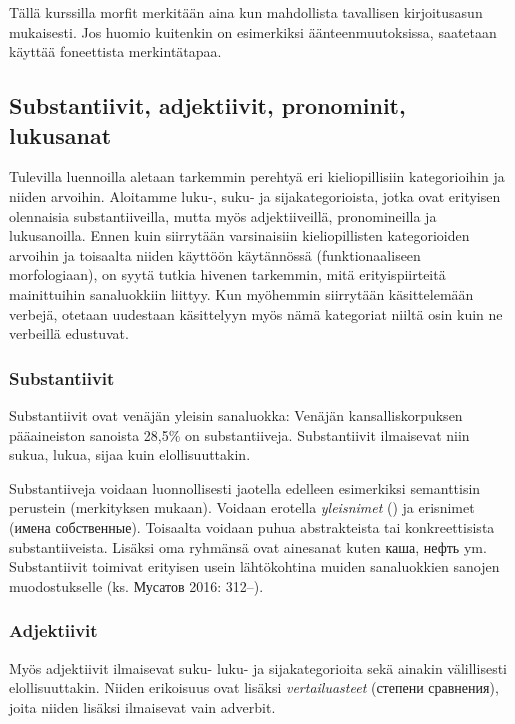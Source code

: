 \documentclass[]{scrartcl}
\begin{document}
Tällä kurssilla morfit merkitään aina kun mahdollista tavallisen
kirjoitusasun mukaisesti. Jos huomio kuitenkin on esimerkiksi
äänteenmuutoksissa, saatetaan käyttää foneettista merkintätapaa.

\subsection{Substantiivit, adjektiivit, pronominit,
lukusanat}\label{substantiivit-adjektiivit-pronominit-lukusanat}

Tulevilla luennoilla aletaan tarkemmin perehtyä eri kieliopillisiin
kategorioihin ja niiden arvoihin. Aloitamme luku-, suku- ja
sijakategorioista, jotka ovat erityisen olennaisia substantiiveilla,
mutta myös adjektiiveillä, pronomineilla ja lukusanoilla. Ennen kuin
siirrytään varsinaisiin kieliopillisten kategorioiden arvoihin ja
toisaalta niiden käyttöön käytännössä (funktionaaliseen morfologiaan),
on syytä tutkia hivenen tarkemmin, mitä erityispiirteitä mainittuihin
sanaluokkiin liittyy. Kun myöhemmin siirrytään käsittelemään verbejä,
otetaan uudestaan käsittelyyn myös nämä kategoriat niiltä osin kuin ne
verbeillä edustuvat.

\subsubsection{Substantiivit}\label{substantiivit}

Substantiivit ovat venäjän yleisin sanaluokka: Venäjän
kansalliskorpuksen pääaineiston sanoista 28,5\% on substantiiveja.
Substantiivit ilmaisevat niin sukua, lukua, sijaa kuin elollisuuttakin.

Substantiiveja voidaan luonnollisesti jaotella edelleen esimerkiksi
semanttisin perustein (merkityksen mukaan). Voidaan erotella
\emph{yleisnimet} () ja erisnimet (имена собственные). Toisaalta voidaan
puhua abstrakteista tai konkreettisista substantiiveista. Lisäksi oma
ryhmänsä ovat ainesanat kuten каша, нефть ym. Substantiivit toimivat
erityisen usein lähtökohtina muiden sanaluokkien sanojen muodostukselle
(ks. Мусатов 2016: 312--).

\subsubsection{Adjektiivit}\label{adjektiivit}

Myös adjektiivit ilmaisevat suku- luku- ja sijakategorioita sekä ainakin
välillisesti elollisuuttakin. Niiden erikoisuus ovat lisäksi
\emph{vertailuasteet} (степени сравнения), joita niiden lisäksi
ilmaisevat vain adverbit.
\end{document}

